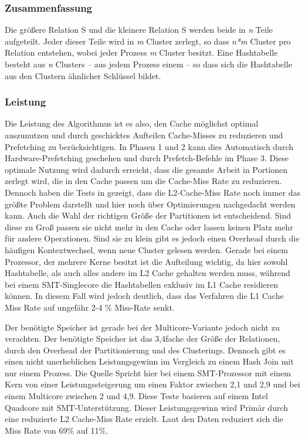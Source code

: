 \subsubsection*{Zusammenfassung}
\label{sec:AA_Hash-Join_Zusammenfassung}

Die größere Relation S und die kleinere Relation S werden beide in \textit{n} Teile aufgeteilt. Jeder dieser Teile wird in \textit{m} Cluster zerlegt, so dass \textit{n*m} Cluster pro Relation entstehen, wobei jeder Prozess \textit{m} Cluster besitzt. Eine Hashtabelle besteht aus \textit{n} Clusters – aus jedem Prozess einem – so dass sich die Hashtabelle aus den Clustern ähnlicher Schlüssel bildet.


\subsubsection*{Leistung}
\label{sec:AA_Hash-Join_Leistung}

Die Leistung des Algorithmus ist es also, den Cache möglichst optimal auszunutzen und durch geschicktes Aufteilen Cache-Misses zu reduzieren und Prefetching zu berücksichtigen. In Phasen 1 und 2 kann dies Automatisch durch Hardware-Prefetching geschehen und durch Prefetch-Befehle im Phase 3. Diese optimale Nutzung wird dadurch erreicht, dass die gesamte Arbeit in Portionen zerlegt wird, die in den Cache passen um die Cache-Miss Rate zu reduzieren. Dennoch haben die Tests in \cite{GARCIA} gezeigt, dass die L2-Cache-Miss Rate noch immer das größte Problem darstellt und hier noch über Optimierungen nachgedacht werden kann. Auch die Wahl der richtigen Größe der Partitionen ist entscheidend. Sind diese zu Groß passen sie nicht mehr in den Cache oder lassen keinen Platz mehr für andere Operationen. Sind sie zu klein gibt es jedoch einen Overhead durch die häufigen Kontextwechsel, wenn neue Cluster gelesen werden. Gerade bei einem Prozessor, der mehrere Kerne besitzt ist die Aufteilung wichtig, da hier sowohl Hashtabelle, als auch alles andere im L2 Cache gehalten werden muss, während bei einem SMT-Singlecore die Hashtabellen exklusiv im L1 Cache residieren können. In diesem Fall wird jedoch deutlich, dass das Verfahren die L1 Cache Miss Rate auf ungefähr 2-4 \% Miss-Rate senkt.

Der benötigte Speicher ist gerade bei der Multicore-Variante jedoch nicht zu verachten. Der benötigte Speicher ist das 3,4fache der Größe der Relationen, durch den Overhead der Partitionierung und des Clusterings. Dennoch gibt es einen nicht unerheblichen Leistungsgewinn im Vergleich zu einem Hash Join mit nur einem Prozess. Die Quelle Spricht hier bei einem SMT-Prozessor mit einem Kern von einer Leistungssteigerung um einen Faktor zwischen 2,1 und 2,9 und bei einem Multicore zwischen 2 und 4,9. Diese Teste basieren auf einem Intel Quadcore mit SMT-Unterstützung. Dieser Leistungsgewinn wird Primär durch eine reduzierte L2 Cache-Miss Rate erzielt. Laut den Daten reduziert sich die Miss Rate von 69\% auf 11\%.


